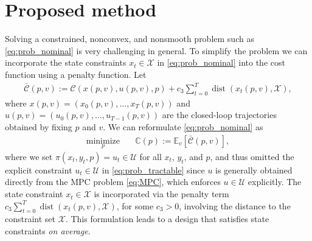 \documentclass[journal,twoside,web,final]{ieeecolor}
\theoremstyle{definition}
\newcommand{\E}{\mathbb{E}}
\newcommand{\C}{\mathbb{C}}
\newcommand{\eb}[1]{\textcolor{blue}{#1}}
\begin{document}
\section{Proposed method}
\label{section:pref}
Solving a constrained, nonconvex, and nonsmooth problem such as \cref{eq:prob_nominal} is very challenging in general.
To simplify the problem we can incorporate the state constraints $x_t\in\mathcal{X}$ in \cref{eq:prob_nominal} into the cost function using a penalty function. 
Let
\begin{align*}
\bar{\mathcal{C}}(p,v) := \mathcal{C}(x(p,v),u(p,v),p) + c_3 \sum_{t=0}^{T} \operatorname*{dist}(x_t(p,v),\mathcal{X}),
\end{align*}
where $x(p,v)=(x_0(p,v),\dots,x_T(p,v))$ and $u(p,v)=(u_0(p,v),\dots,u_{T-1}(p,v))$ are the closed-loop trajectories obtained by fixing $p$ and $v$.
We can reformulate \cref{eq:prob_nominal} as
\begin{align}
\underset{p}{\text{minimize}} & \quad \C(p) := \E_v [\bar{\mathcal{C}}(p,v)],
\label{eq:prob_tractable}
\end{align}
where we set $\pi(x_t, y_t, p) = u_t \in \mathcal{U}$ for all $x_t$, $y_t$, and $p$, and thus omitted the explicit constraint $u_t \in \mathcal{U}$ in \cref{eq:prob_tractable} since $u$ is generally obtained directly from the MPC problem \cref{eq:MPC}, which enforces $u \in \mathcal{U}$ explicitly. 
The state constraint $x_t\in \mathcal{X}$ is incorporated via the penalty term $c_3 \sum_{t=0}^{T} \operatorname*{dist}(x_t(p,v),\mathcal{X})$, for some $c_3>0$, involving the distance to the constraint set $\mathcal{X}$. 
This formulation leads to a design that satisfies state constraints \emph{on average}.
\end{document}
